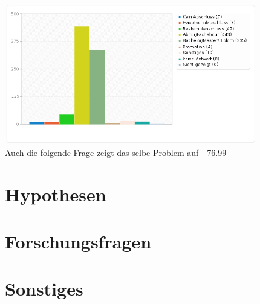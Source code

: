 \includegraphics[scale=0.55]{images/schulabschluss}
Auch die folgende Frage zeigt das selbe Problem auf - 76.99%

\section{Hypothesen}

\section{Forschungsfragen}


\section{Sonstiges}
